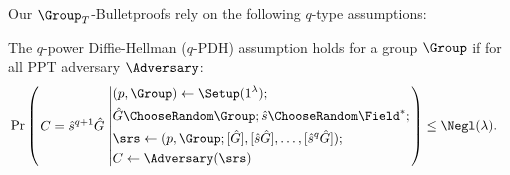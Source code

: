 Our $\Group_T$-Bulletproofs rely on the following $q$-type assumptions:
\begin{assumption}
\label{def:pdh}
	The $q$-power Diffie-Hellman ($q$-PDH) assumption holds for a group $\Group$ if for all PPT adversary $\Adversary$:
	\begin{align}
		& \Pr
		\left(
			\left.
			\begin{aligned}
				& C = \hat{s}^{q + 1}\hat{G} \\ 
			\end{aligned}
			\right.
			\left|
			\begin{aligned}
				& (p, \Group) \leftarrow \Setup(1^{\lambda}); \\
				& \hat{G} \ChooseRandom \Group; \hat{s}\ChooseRandom \Field^*; \\
				& \srs \leftarrow (p, \Group; [\hat{G}], [\hat{s}\hat{G}], \ldots, [\hat{s}^q \hat{G}]);\\
				& C \leftarrow \Adversary(\srs)
			\end{aligned}
			\right.
		\right)
		\le \Negl(\lambda).
		\nonumber
	\end{align}
\end{assumption}



